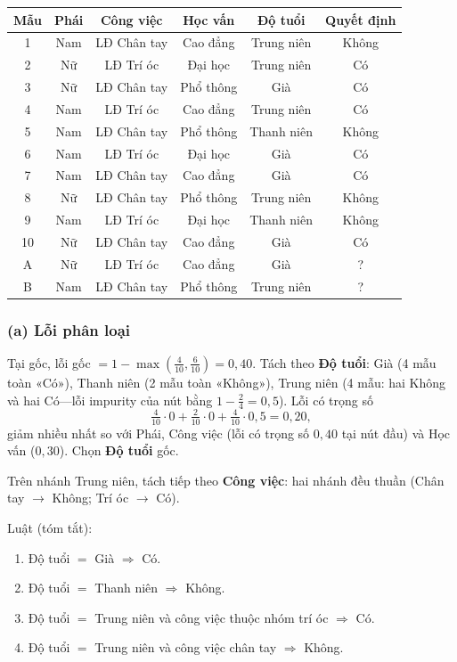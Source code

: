\begin{center}
{\footnotesize
\begin{tabular}{@{}cccccc@{}}\toprule
Mẫu & Phái & Công việc & Học vấn & Độ tuổi & Quyết định\\\midrule
1 & Nam & LĐ Chân tay & Cao đẳng & Trung niên & Không\\
2 & Nữ & LĐ Trí óc & Đại học & Trung niên & Có\\
3 & Nữ & LĐ Chân tay & Phổ thông & Già & Có\\
4 & Nam & LĐ Trí óc & Cao đẳng & Trung niên & Có\\
5 & Nam & LĐ Chân tay & Phổ thông & Thanh niên & Không\\
6 & Nam & LĐ Trí óc & Đại học & Già & Có\\
7 & Nam & LĐ Chân tay & Cao đẳng & Già & Có\\
8 & Nữ & LĐ Chân tay & Phổ thông & Trung niên & Không\\
9 & Nam & LĐ Trí óc & Đại học & Thanh niên & Không\\
10 & Nữ & LĐ Chân tay & Cao đẳng & Già & Có\\
A & Nữ & LĐ Trí óc & Cao đẳng & Già & ?\\
B & Nam & LĐ Chân tay & Phổ thông & Trung niên & ?\\
\bottomrule
\end{tabular}
}
\end{center}

\subsubsection*{(a) Lỗi phân loại}

Tại gốc, lỗi gốc \(=1-\max(\tfrac{4}{10},\tfrac{6}{10})=0{,}40\).
Tách theo \textbf{Độ tuổi}: Già (4 mẫu toàn «Có»), Thanh niên (2 mẫu toàn «Không»), Trung niên (4 mẫu: hai Không và hai Có---lỗi impurity của nút bằng \(1-\tfrac{2}{4}=0{,}5\)). Lỗi có trọng số
\[
\tfrac{4}{10}\cdot 0+\tfrac{2}{10}\cdot 0+\tfrac{4}{10}\cdot 0{,}5=0{,}20,
\]
giảm nhiều nhất so với Phái, Công việc (lỗi có trọng số \(0{,}40\) tại nút đầu) và Học vấn (\(0{,}30\)). Chọn \textbf{Độ tuổi} gốc.

Trên nhánh Trung niên, tách tiếp theo \textbf{Công việc}: hai nhánh đều thuần (Chân tay \(\to\) Không; Trí óc \(\to\) Có).

Luật (tóm tắt):
\begin{enumerate}\setlength\itemsep{0pt}
  \item Độ tuổi \(=\) Già \(\Rightarrow\) Có.
  \item Độ tuổi \(=\) Thanh niên \(\Rightarrow\) Không.
  \item Độ tuổi \(=\) Trung niên và công việc thuộc nhóm trí óc \(\Rightarrow\) Có.
  \item Độ tuổi \(=\) Trung niên và công việc chân tay \(\Rightarrow\) Không.
\end{enumerate}

